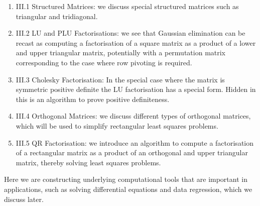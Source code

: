 \documentclass[12pt,a4paper]{book}
\theoremstyle{definition}
\begin{document}
\begin{enumerate}
    \item III.1 Structured Matrices: we discuss special structured matrices such as triangular and tridiagonal.
    \item III.2 LU and PLU Factorisations: we see that Gaussian elimination can be recast as computing a factorisation of a square matrix as a product of a lower and upper triangular matrix, potentially with a permutation matrix
    corresponding to the case where row pivoting is required.
    \item III.3 Cholesky Factorisation: In the special case where the matrix is symmetric positive
    definite the LU factorisation has a special form. Hidden in this is an algorithm to prove positive definiteness.
\item III.4 Orthogonal Matrices: we discuss different types of orthogonal matrices, which will be used to simplify rectangular least squares problems.
\item III.5 QR Factorisation: we introduce an algorithm to compute a factorisation of a rectangular matrix as a product of an orthogonal and upper triangular matrix, thereby solving least squares problems.
\end{enumerate}

Here we are constructing underlying computational tools that are important in applications, such as solving differential equations and data regression, which we discuss later. 











% 
% 
\end{document}
